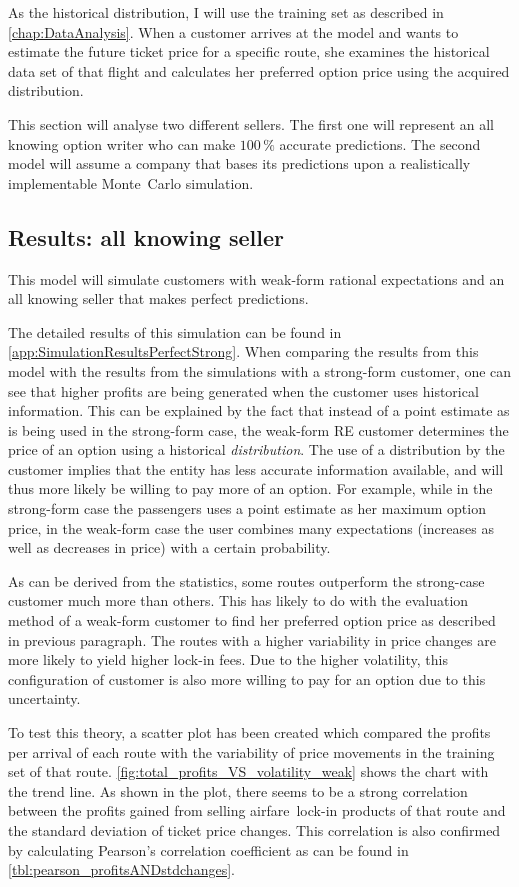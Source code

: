 As the historical distribution, I will use the training set as described in \autoref{chap:DataAnalysis}. When a customer arrives at the model and wants to estimate the future ticket price for a specific route, she examines the historical data set of that flight and calculates her preferred option price using the acquired distribution.

This section will analyse two different sellers. The first one will represent an all knowing option writer who can make $100\,\%$ accurate predictions. The second model will assume a company that bases its predictions upon a realistically implementable Monte~Carlo simulation.

\subsection{Results: all knowing seller}
This model will simulate customers with weak-form rational expectations and an all knowing seller that makes perfect predictions.

The detailed results of this simulation can be found in \autoref{app:SimulationResultsPerfectStrong}. When comparing the results from this model with the results from the simulations with a strong-form customer, one can see that higher profits are being generated when the customer uses historical information. This can be explained by the fact that instead of a point estimate as is being used in the strong-form case, the weak-form RE customer determines the price of an option using a historical \emph{distribution}. The use of a distribution by the customer implies that the entity has less accurate information available, and will thus more likely be willing to pay more of an option. For example, while in the strong-form case the passengers uses a point estimate as her maximum option price, in the weak-form case the user combines many expectations (increases as well as decreases in price) with a certain probability.

As can be derived from the statistics, some routes outperform the strong-case customer much more than others. This has likely to do with the evaluation method of a weak-form customer to find her preferred option price as described in previous paragraph. The routes with a higher variability in price changes are more likely to yield higher lock-in fees. Due to the higher volatility, this configuration of customer is also more willing to pay for an option due to this uncertainty.

To test this theory, a scatter plot has been created which compared the profits per arrival of each route with the variability of price movements in the training set of that route. \autoref{fig:total_profits_VS_volatility_weak} shows the chart with the trend line. As shown in the plot, there seems to be a strong correlation between the profits gained from selling airfare~lock-in products of that route and the standard deviation of ticket price changes. This correlation is also confirmed by calculating Pearson's correlation coefficient as can be found in \autoref{tbl:pearson_profitsANDstdchanges}.

